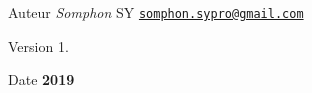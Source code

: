 \begin{DoxyAuthor}{Auteur}
{\itshape Somphon} SY \href{mailto:somphon.sypro@gmail.com}{\tt somphon.\+sypro@gmail.\+com} 
\end{DoxyAuthor}
\begin{DoxyVersion}{Version}
1. 
\end{DoxyVersion}
\begin{DoxyDate}{Date}
{\bfseries 2019} 
\end{DoxyDate}

